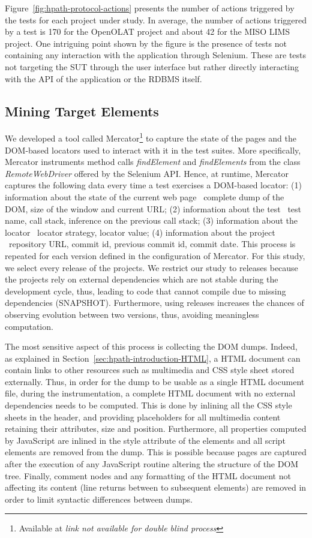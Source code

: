 Figure~\ref{fig:hpath-protocol-actions} presents the number of actions triggered by the tests for each project under study. In average, the number of actions triggered by a test is 170 for the OpenOLAT project and about 42 for the MISO LIMS project. One intriguing point shown by the figure is the presence of tests not containing any interaction with the application through Selenium. These are tests not targeting the SUT through the user interface but rather directly interacting with the API of the application or the RDBMS itself.

\subsection{Mining Target Elements}
\label{sec:hpath-protocol-elements}

We developed a tool called Mercator\footnote{Available at \textit{link not available for double blind process}} to capture the state of the pages and the DOM-based locators used to interact with it in the test suites. More specifically, Mercator instruments method calls \emph{findElement} and \emph{findElements} from the class \emph{RemoteWebDriver} offered by the Selenium API. Hence, at runtime, Mercator captures the following data every time a test exercises a DOM-based locator: (1) information about the state of the current web page \ie\ complete dump of the DOM, size of the window and current URL; (2) information about the test \ie\ test name, call stack, inference on the previous call stack; (3) information about the locator \ie\ locator strategy, locator value; (4) information about the project \ie\ repository URL, commit id, previous commit id, commit date. This process is repeated for each version defined in the configuration of Mercator. For this study, we select every release of the projects. We restrict our study to releases because the projects rely on external dependencies which are not stable during the development cycle, thus, leading to code that cannot compile due to missing dependencies (SNAPSHOT). Furthermore, using releases increases the chances of observing evolution between two versions, thus, avoiding meaningless computation.

The most sensitive aspect of this process is collecting the DOM dumps. Indeed, as explained in Section~\ref{sec:hpath-introduction-HTML}, a HTML document can contain links to other resources such as multimedia and CSS style sheet stored externally. Thus, in order for the dump to be usable as a single HTML document file, during the instrumentation, a complete HTML document with no external dependencies needs to be computed. This is done by inlining all the CSS style sheets in the header, and providing placeholders for all multimedia content retaining their attributes, size and position. Furthermore, all properties computed by JavaScript are inlined in the style attribute of the elements and all script elements are removed from the dump. This is possible because pages are captured after the execution of any JavaScript routine altering the structure of the DOM tree. Finally, comment nodes and any formatting of the HTML document not affecting its content (line returns between to subsequent elements) are removed in order to limit syntactic differences between dumps.

